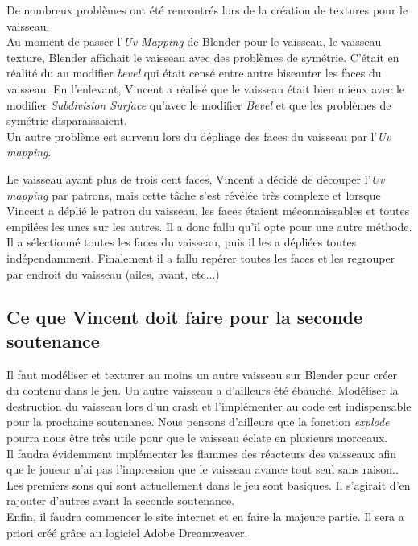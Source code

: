 \documentclass[10pt, titlepage]{report}
\begin{document}
De nombreux problèmes ont été rencontrés lors de la création de textures pour le vaisseau.\\

Au moment de passer l’\textit{Uv Mapping} de Blender pour le vaisseau, le vaisseau texture, Blender affichait le vaisseau avec des problèmes de symétrie. C’était en réalité du au modifier \textit{bevel} qui était censé entre autre biseauter les faces du vaisseau. En l’enlevant, Vincent a réalisé que le vaisseau était bien mieux avec le modifier  \textit{Subdivision Surface} qu’avec le modifier \textit{Bevel} et que les problèmes de symétrie disparaissaient.\\

Un autre problème est survenu lors du dépliage des faces du vaisseau par l’\textit{Uv mapping}.

Le vaisseau ayant plus de trois cent faces, Vincent a décidé de découper l’\textit{Uv mapping} par patrons, mais cette tâche s’est révélée très complexe et lorsque Vincent a déplié le patron du vaisseau, les faces étaient méconnaissables et toutes empilées les unes sur les autres. Il a donc fallu qu’il opte pour une autre méthode. Il a sélectionné toutes les faces du vaisseau, puis il les a dépliées toutes indépendamment. Finalement il a fallu repérer toutes les faces et les regrouper par endroit du vaisseau (ailes, avant, etc...)

\subsection{Ce que Vincent doit faire pour la seconde soutenance}
Il faut modéliser et texturer au moins un autre vaisseau sur Blender pour créer du contenu dans le jeu. Un autre vaisseau a d’ailleurs été ébauché.
Modéliser la destruction du vaisseau lors d'un crash et l'implémenter au code est indispensable pour la prochaine soutenance. Nous pensons d’ailleurs que la fonction \textit{explode} pourra nous être très utile pour que le vaisseau éclate en plusieurs morceaux.\\

Il faudra évidemment implémenter les flammes des réacteurs des vaisseaux afin que le joueur n’ai pas l’impression que le vaisseau avance tout seul sans raison..
Les premiers sons qui sont actuellement dans le jeu sont basiques. Il s’agirait d’en rajouter d’autres avant la seconde soutenance.\\

Enfin, il faudra commencer le site internet et en faire la majeure partie. Il sera a priori créé grâce au logiciel Adobe Dreamweaver.
\end{document}
